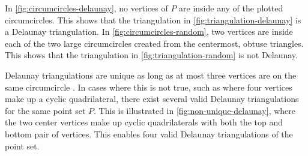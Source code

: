 In \autoref{fig:circumcircles-delaunay}, no vertices of $P$ are inside any of the plotted circumcircles. This shows that the triangulation in \autoref{fig:triangulation-delaunay} is a Delaunay triangulation. In \autoref{fig:circumcircles-random}, two vertices are inside each of the two large circumcircles created from the centermost, obtuse triangles. This shows that the triangulation in \autoref{fig:triangulation-random} is not Delaunay.

Delaunay triangulations are unique as long as at most three vertices are on the same circumcircle \cite[Theorem 2.1]{UPR_thesis}. In cases where this is not true, such as where four vertices make up a cyclic quadrilateral, there exist several valid Delaunay triangulations for the same point set $P$. This is illustrated in \autoref{fig:non-unique-delaunay}, where the two center vertices make up cyclic quadrilaterals with both the top and bottom pair of vertices. This enables four valid Delaunay triangulations of the point set.

